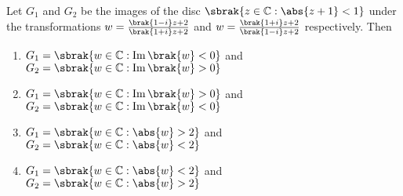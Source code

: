 \item Let $G_1$ and $G_2$ be the images of the disc $\sbrak{z \in \mathbb{C} : \abs{z+1} < 1}$ under the transformations
  $
  w = \frac{\brak{1-i}z + 2}{\brak{1+i}z + 2}
  $
  and
  $
  w = \frac{\brak{1+i}z + 2}{\brak{1-i}z + 2}
  $
  respectively. Then  

  \begin{enumerate}
    \item $G_1 = \sbrak{w \in \mathbb{C} : \operatorname{Im}\brak{w} < 0}$ and $G_2 = \sbrak{w \in \mathbb{C} : \operatorname{Im}\brak{w} > 0}$
    \item $G_1 = \sbrak{w \in \mathbb{C} : \operatorname{Im}\brak{w} > 0}$ and $G_2 = \sbrak{w \in \mathbb{C} : \operatorname{Im}\brak{w} < 0}$
    \item $G_1 = \sbrak{w \in \mathbb{C} : \abs{w} > 2}$ and $G_2 = \sbrak{w \in \mathbb{C} : \abs{w} < 2}$
    \item $G_1 = \sbrak{w \in \mathbb{C} : \abs{w} < 2}$ and $G_2 = \sbrak{w \in \mathbb{C} : \abs{w} > 2}$
  \end{enumerate}



